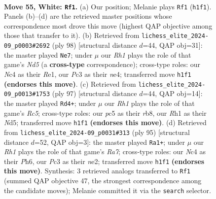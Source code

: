 \documentclass[11pt]{article}
\begin{document}
\clearpage

\begin{figure}[p]\centering
\begin{subfigure}{0.46\textwidth}\centering
\resizebox{\linewidth}{!}{%
\newchessgame
\chessboard[
  setfen={3r4/6k1/1pb5/p1p5/2N5/K1P3PN/4rp1P/7R w - - 6 55},
  showmover=false,
  pgfstyle=straightmove, color=movearrow, markmove={h1-f1}
]}
\caption{}
\end{subfigure}\hfill
\begin{subfigure}{0.46\textwidth}\centering
\resizebox{\linewidth}{!}{%
\newchessgame
\chessboard[
  setfen={3r3k/p7/1pR5/1p1N2p1/3Pn1P1/4P3/r7/4R1K1 w - - 1 50},
  showmover=false,
  pgfstyle=straightmove, color=movearrow, markmove={d5-e7}
]}
\caption{}
\end{subfigure}
\\[4pt]
\begin{subfigure}{0.46\textwidth}\centering
\resizebox{\linewidth}{!}{%
\newchessgame
\chessboard[
  setfen={1R6/4k3/3p4/3n2p1/1Pr4p/4NP1P/3K2P1/8 b - - 0 49},
  showmover=false,
  pgfstyle=straightmove, color=movearrow, markmove={c4-d4}
]}
\caption{}
\end{subfigure}\hfill
\begin{subfigure}{0.46\textwidth}\centering
\resizebox{\linewidth}{!}{%
\newchessgame
\chessboard[
  setfen={8/p7/4p2p/1p1nP2k/5PR1/7P/r3N3/4K3 b - - 6 48},
  showmover=false,
  pgfstyle=straightmove, color=movearrow, markmove={a2-a1}
]}
\caption{}
\end{subfigure}
\caption{\textbf{Move 55, White: \texttt{Rf1}.} (a) Our position; Melanie plays \texttt{Rf1} (\texttt{h1f1}). Panels (b)--(d) are the retrieved master positions whose correspondence most drove this move (highest QAP objective among those that transfer to it). (b) Retrieved from \texttt{lichess\_elite\_2024-09\_p0003\#2692} (ply 98) [structural distance $d$=44, QAP obj=31]: the master played \texttt{Ne7}; under $\mu$ our \emph{Rh1} plays the role of that game's \emph{Nd5} (a \textbf{cross-type} correspondence); cross-type roles: our \emph{N}c4 as their \emph{R}e1, our \emph{P}c3 as their \emph{n}e4; transferred move \texttt{h1f1} \textbf{(endorses this move)}. (c) Retrieved from \texttt{lichess\_elite\_2024-09\_p0013\#1753} (ply 97) [structural distance $d$=44, QAP obj=14]: the master played \texttt{Rd4+}; under $\mu$ our \emph{Rh1} plays the role of that game's \emph{Rc5}; cross-type roles: our \emph{p}c5 as their \emph{r}b8, our \emph{R}h1 as their \emph{N}d5; transferred move \texttt{h1f1} \textbf{(endorses this move)}. (d) Retrieved from \texttt{lichess\_elite\_2024-09\_p0031\#313} (ply 95) [structural distance $d$=52, QAP obj=3]: the master played \texttt{Ra1+}; under $\mu$ our \emph{Rh1} plays the role of that game's \emph{Ra7}; cross-type roles: our \emph{N}c4 as their \emph{P}h6, our \emph{P}c3 as their \emph{n}e2; transferred move \texttt{h1f1} \textbf{(endorses this move)}. Synthesis: 3 retrieved analogs transferred to \texttt{Rf1} (summed QAP objective 47, the strongest correspondence among the candidate moves); Melanie committed it via the \texttt{search} selector.}
\label{fig:thought-m108}
\end{figure}
\end{document}
